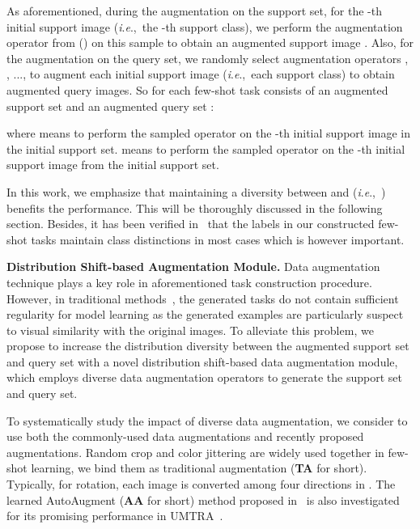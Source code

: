 \documentclass[letterpaper]{article} \usepackage{aaai21}  \usepackage{times}  \usepackage{helvet} \usepackage{courier}  \usepackage[hyphens]{url}  \usepackage{graphicx} \urlstyle{rm} \def\UrlFont{\rm}  \usepackage{natbib}  \usepackage{caption} \usepackage{url}
\newcommand{\ie}{\textit{i}.\textit{e}.,}
\begin{document}
As aforementioned, during the augmentation on the support set, for the -th initial support image  (\ie~the -th support class), we perform the augmentation operator  from  () on this sample to obtain an augmented support image . Also, for the augmentation on the query set, we randomly select  augmentation operators , , ...,  to augment each initial support image (\ie~each support class) to obtain  augmented query images. So for each few-shot task  consists of an augmented support set  and an augmented query set :

where  means to perform the sampled operator  on the -th initial support image  in the initial support set.  means to perform the sampled operator  on the -th initial support image  from the initial support set.




In this work, we emphasize that maintaining a diversity between  and  (\ie~) benefits the performance. This will be thoroughly discussed in the following section. Besides, it has been verified in~\cite{UMTRA2019NIPS} that the labels in our constructed few-shot tasks maintain class distinctions in most cases which is however important.
\fi





\noindent\textbf{Distribution Shift-based Augmentation Module.}
Data augmentation technique plays a key role in aforementioned task construction procedure. However, in traditional methods~\cite{UMTRA2019NIPS, AAL2019ICML}, the generated tasks do not contain sufficient regularity for model learning as the generated examples are particularly suspect to visual similarity with the original images.
To alleviate this problem, we propose to increase the distribution diversity between the augmented support set and query set with a novel distribution shift-based data augmentation module, which employs diverse data augmentation operators to generate the support set and query set.



To systematically study the impact of diverse data augmentation, we consider to use both the commonly-used data augmentations and recently proposed augmentations.
Random crop and color jittering are widely used together in few-shot learning, we bind them as traditional augmentation (\textbf{TA} for short). Typically, for rotation, each image is converted among four directions in . The learned AutoAugment (\textbf{AA} for short) method proposed in~\cite{Cubuk2019CVPR} is also investigated for its promising performance in UMTRA~\cite{UMTRA2019NIPS}. 
\end{document}
